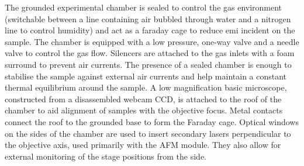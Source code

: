 \documentclass{article}
\begin{document}
The grounded experimental chamber is sealed to control the gas environment (switchable between a line containing air bubbled through water and a nitrogen line to control humidity) and act as a faraday cage to reduce \gls{emi} incident on the sample. The chamber is equipped with a low pressure, one-way valve and a needle valve to control the gas flow. Silencers are attached to the gas inlets with a foam surround to prevent air currents. The presence of a sealed chamber is enough to stabilise the sample against external air currents and help maintain a constant thermal equilibrium around the sample. A low magnification basic microscope, constructed from a disassembled webcam CCD, is attached to the roof of the chamber to aid alignment of samples with the objective focus. Metal contacts connect the roof to the grounded base to form the Faraday cage. Optical windows on the sides of the chamber are used to insert secondary lasers perpendicular to the objective axis, used primarily with the AFM module. They also allow for external monitoring of the stage positions from the side.

\FloatBarrier
\end{document}

